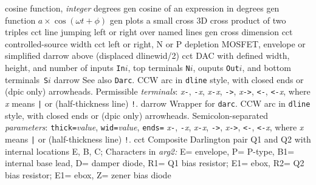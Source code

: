   {cosine function, {\sl integer\/} degrees}
  {gen}
  {cosine of an expression in degrees}
  {gen}
  {function $a\times\cos(\omega t + \phi)$ }
  {gen}
  {plots a small cross}
  {3D}
  {cross product of two triples}
  {cct}
  {line jumping left or right over named lines}
  {gen}
  {cross dimension}
  {cct}
  {controlled-source width}
%
  {cct}
  {left or right, N or P depletion MOSFET, envelope or simplified
    }
  {darrow}
  {above (displaced dlinewid/2)}
  {cct}
  {DAC with defined width, height, and number of inputs {\tt In$i$},
    top terminals {\tt N$i$}, ouputs {\tt Out$i$},
    and bottom terminals~{\tt S$i$} }
  {darrow}
  {See also {\tt Darc}.
   CCW arc in {\tt dline} style, with closed ends or (dpic only) arrowheads.
  Permissible {\sl terminals}:
  {\sl x}{\tt -},
  {\tt -}{\sl x}, {\sl x}{\tt -}{\sl x}, {\tt ->}, {\sl x}{\tt ->},
  {\tt <-}, {\tt <-}{\sl x}, {\tt <->}
  where {\sl x} means {\tt |} or (half-thickness line) {\tt !}.}
  {darrow}
  {Wrapper for {\tt darc}.
   CCW arc in {\tt dline} style, with closed ends or (dpic only) arrowheads.
  Semicolon-separated {\sl parameters}:
  {\tt thick=}{\sl value}, {\tt wid=}{\sl value}, {\tt ends=}
  {\sl x}{\tt -},
  {\tt -}{\sl x}, {\sl x}{\tt -}{\sl x}, {\tt ->}, {\sl x}{\tt ->},
  {\tt <-}, {\tt <-}{\sl x}, {\tt <->}
  where {\sl x} means {\tt |} or (half-thickness line) {\tt !}.}
  {cct}
  {Composite Darlington pair Q1 and Q2 with internal locations E, B, C;
   Characters in {\sl arg2:}
   E= envelope,
   P= P-type,
   B1= internal base lead,
   D= damper diode,
   R1= Q1 bias resistor; E1= ebox,
   R2= Q2 bias resistor; E1= ebox,
   Z= zener bias diode 
    }
